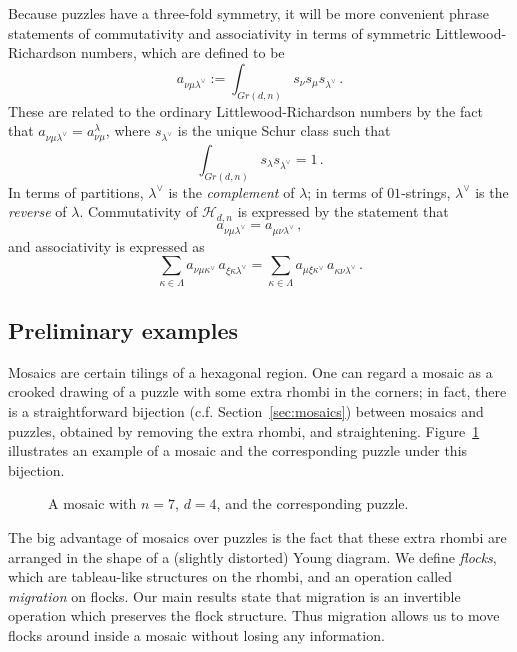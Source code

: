 \documentclass[12pt]{article}
\newcommand{\ringH}{\mathcal{H}_{d,n}}
\begin{document}
Because puzzles have a three-fold symmetry, it will be more
convenient phrase statements of commutativity and associativity
in terms of symmetric Littlewood-Richardson numbers, which
are defined to be
$$a_{\nu \mu \lambda^\vee} := \int_{Gr(d,n)} s_\nu s_\mu s_{\lambda^\vee}\,.$$
These are related to the
ordinary Littlewood-Richardson numbers by the fact that 
$a_{\nu \mu \lambda^\vee} = a_{\nu \mu}^\lambda$,
where $s_{\lambda^\vee}$ is the unique Schur class such that
$$\int_{Gr(d,n)} s_\lambda s_{\lambda^\vee} = 1\,.$$
In terms of partitions, $\lambda^\vee$ is the 
{\em complement} of $\lambda$; in terms of $01$-strings, $\lambda^\vee$ 
is the {\em reverse} of $\lambda$.
Commutativity of $\ringH$ is expressed by the statement that
\begin{equation}
\label{eq:commutativity}
a_{\nu \mu \lambda^\vee} = a_{\mu \nu \lambda^\vee}\,,
\end{equation}
and associativity is expressed as
\begin{equation}
\label{eq:associativity}
\sum_{\kappa \in \Lambda} a_{\nu \mu \kappa^\vee}\, a_{\xi \kappa \lambda^\vee}
= \sum_{\kappa \in \Lambda} a_{\mu \xi \kappa^\vee}\, a_{\kappa \nu \lambda^\vee} \,.
\end{equation}

\subsection{Preliminary examples}
Mosaics are certain tilings
of a hexagonal region.  One can regard a mosaic as a crooked
drawing of a puzzle with some extra rhombi in the corners; in fact, 
there is a straightforward bijection (c.f. Section~\ref{sec:mosaics})
between 
mosaics and puzzles, obtained by removing the extra rhombi, and 
straightening.  
Figure~\ref{fig:mosaicex} illustrates an example of a mosaic and the
corresponding puzzle under this bijection.  

%
\begin{figure}[htbp]
\begin{center}
\caption{A mosaic with $n=7$, $d=4$, and the corresponding puzzle.}
\label{fig:mosaicex}
\end{center}
\end{figure}
%

The big advantage of mosaics over puzzles is the fact that 
these extra rhombi
are arranged in the shape of a (slightly distorted) Young diagram.
We define {\em flocks}, which are tableau-like structures on the rhombi,
and an operation called {\em migration} on flocks.  
Our main results state that migration is
an invertible operation which preserves the flock structure.
Thus migration allows us to move flocks around 
inside a mosaic without losing any information.
\end{document}
